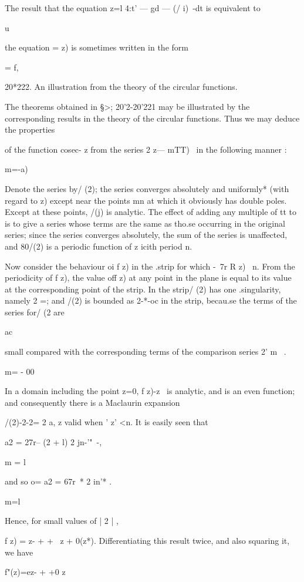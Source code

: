 {The result that the equation z=l 4:t' — gd — (/ i)~-dt is equivalent
to

u

the equation = z) is sometimes written in the form

= f,

20*222. An illustration from the theory of the circular functions.

The theorems obtained in §>; 20'2-20'221 may be illustrated by the
corresponding results in the theory of the circular functions. Thus we
may deduce the properties

of the function cosec- z from the series 2 z— mTT)~ in the following
manner :

m=-a)

Denote the series by/ (2); the series converges absolutely and
uniformly* (with regard to z) except near the points mn at which it
obviously has double poles. Except at these points, /(j) is analytic.
The effect of adding any multiple of tt to is to give a series whose
terms are the same as tho.se occurring in the original series; since
the series converges absolutely, the sum of the series is unaffected,
and 80/(2) is a periodic function of z icith period n.

Now consider the behaviour oi f z) in the .strip for which -\ 7r R z)
\ n. From the periodicity of f z), the value off z) at any point in
the plane is equal to its value at the corresponding point of the
strip. In the strip/ (2) has one .singularity, namely 2 =; and /(2)
is bounded as 2-*-oc in the strip, becau.se the terms of the series
for/ (2 are

ac

small compared with the corresponding terms of the comparison series
2' m~ .

m= - 00

In a domain including the point z=0, f z)-z~ is analytic, and is an
even function; and consequently there is a Maclaurin expansion

/(2)-2-2= 2 a, z valid when ' z' <n. It is easily seen that

a2 = 27r-- (2 + l) 2 jn-'"~-,

m = l

and so o= a2 = 67r~* 2 in'* .

m=l

Hence, for small values of | 2 | ,

f z) = z- + + \ z + 0(z*). Differentiating this result twice, and also
squaring it, we have

f"(z)=ez- + +0 z%

}

